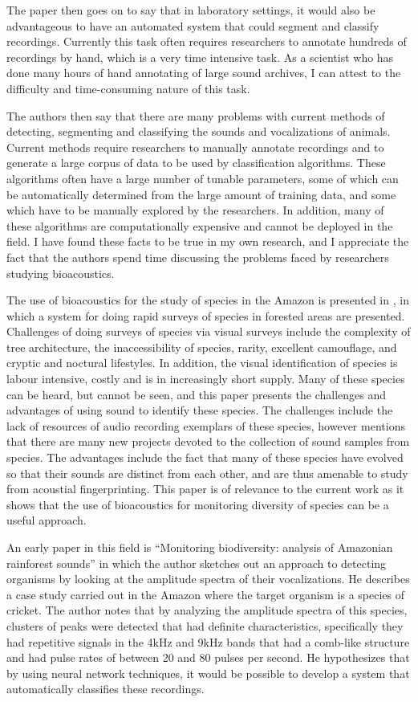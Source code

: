 The paper then goes on to say that in laboratory settings, it would
also be advantageous to have an automated system that could segment
and classify recordings.  Currently this task often requires
researchers to annotate hundreds of recordings by hand, which is a
very time intensive task.  As a scientist who has done many hours of
hand annotating of large sound archives, I can attest to the
difficulty and time-consuming nature of this task.

The authors then say that there are many problems with current methods
of detecting, segmenting and classifying the sounds and vocalizations
of animals.  Current methods require researchers to manually annotate
recordings and to generate a large corpus of data to be used by
classification algorithms.  These algorithms often have a large number
of tunable parameters, some of which can be automatically determined
from the large amount of training data, and some which have to be
manually explored by the researchers.  In addition, many of these
algorithms are computationally expensive and cannot be deployed in the
field.  I have found these facts to be true in my own research, and I
appreciate the fact that the authors spend time discussing the
problems faced by researchers studying bioacoustics.

The use of bioacoustics for the study of species in the Amazon is
presented in \cite{riede93}, in which a system for doing rapid surveys
of species in forested areas are presented.  Challenges of doing
surveys of species via visual surveys include the complexity of tree
architecture, the inaccessibility of species, rarity, excellent
camouflage, and cryptic and noctural lifestyles.  In addition, the
visual identification of species is labour intensive, costly and is in
increasingly short supply.  Many of these species can be heard, but
cannot be seen, and this paper presents the challenges and advantages
of using sound to identify these species.  The challenges include the
lack of resources of audio recording exemplars of these species,
however mentions that there are many new projects devoted to the
collection of sound samples from species.  The advantages include the
fact that many of these species have evolved so that their sounds are
distinct from each other, and are thus amenable to study from
acoustial fingerprinting.  This paper is of relevance to the current
work as it shows that the use of bioacoustics for monitoring diversity
of species can be a useful approach.

An early paper in this field is ``Monitoring biodiversity: analysis of
Amazonian rainforest sounds'' \cite{riede93} in which the author
sketches out an approach to detecting organisms by looking at the
amplitude spectra of their vocalizations.  He describes a case study
carried out in the Amazon where the target organism is a species of
cricket.  The author notes that by analyzing the amplitude spectra of
this species, clusters of peaks were detected that had definite
characteristics, specifically they had repetitive signals in the 4kHz
and 9kHz bands that had a comb-like structure and had pulse rates of
between 20 and 80 pulses per second.  He hypothesizes that by using
neural network techniques, it would be possible to develop a system
that automatically classifies these recordings.

